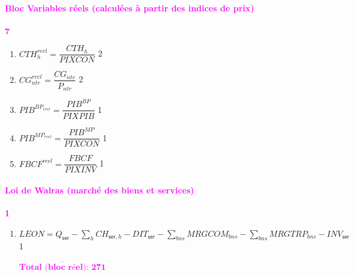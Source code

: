 \documentclass[11pt,a4paper]{article}
\newcommand{\bns}{\mathit{bns}}
\newcommand{\CG}{\mathit{CG}}
\newcommand{\CH}{\mathit{CH}}
\newcommand{\CTH}{\mathit{CTH}}
\newcommand{\DIT}{\mathit{DIT}}
\newcommand{\FBCF}{\mathit{FBCF}}
\newcommand{\INV}{\mathit{INV}}
\newcommand{\MRGTRP}{\mathit{MRGTRP}}
\newcommand{\MRGCOM}{\mathit{MRGCOM}}
\newcommand{\LEON}{\mathit{LEON}}
\newcommand{\ntr}{\mathit{ntr}}
\newcommand{\ser}{\mathsf{ser}}
\newcommand{\PIXPIB}{\mathit{PIXPIB}}
\newcommand{\PIXCON}{\mathit{PIXCON}}
\newcommand{\PIXINV}{\mathit{PIXINV}}
\newcommand{\redparagraph}[1]{\paragraph*{\large\textcolor{Fuchsia}{#1}}}
\newcommand{\PIB}{\mathit{PIB}}
\begin{document}
	
	\redparagraph{Bloc Variables réels (calculées à partir des indices de prix)}\hfill \textcolor{Fuchsia}{\textbf{7}} 
	\begin{enumerate}[itemsep=2pt,label=\textbf{eq\arabic*}.,resume,  ref=\textbf{eq\arabic*}]
		
		\item $ \CTH_h^{\mathit{reel}} = \dfrac{\CTH_h}{\PIXCON}$ \hfill 2 
		
		\item $ \CG_{\ntr}^{\mathit{reel}} = \dfrac{\CG_{\ntr}}{P_{\ntr}}$ \hfill 2 
		
		\item $ \PIB^{\mathit{BP}_\mathit{reel}} = \dfrac{\PIB^{BP}}{\PIXPIB}$ \hfill 1 
		
		\item $ \PIB^{\mathit{MP}_\mathit{reel}} = \dfrac{\PIB^{MP}}{\PIXCON}$ \hfill 1 
		
		\item $ \FBCF^{\mathit{reel}} = \dfrac{\FBCF}{\PIXINV}$ \hfill 1 		
		
	\end{enumerate}
	
	
	
	
	\redparagraph{Loi de Walras (marché des biens et services)}\hfill \textcolor{Fuchsia}{\textbf{1}} 
	\begin{enumerate}[itemsep=2pt,label=\textbf{eq\arabic*}.,resume,  ref=\textbf{eq\arabic*}]
		
		\item $\LEON  = Q_{\ser}  - \sum_{h} \CH_{\ser,h} - \DIT_{\ser}	 -  \sum_{\bns}\MRGCOM_{\bns} - \sum_{\bns}\MRGTRP_{\bns} - \INV_{\ser}$ \label{it:walras} \hfill 1
		
		\hfill \textcolor{Fuchsia}{$\overline{\textbf{Total (bloc réel): 271}}$}
	\end{enumerate}
	
\end{document}
